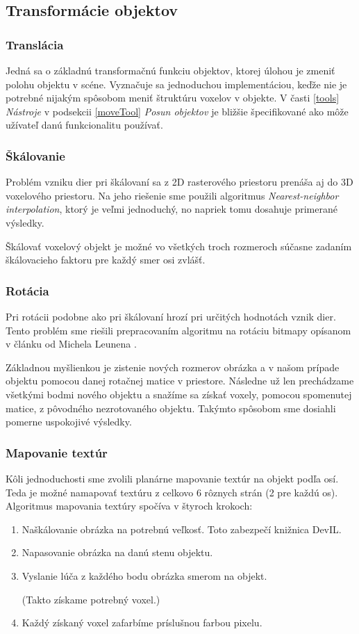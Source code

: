 \subsection{Transformácie objektov}
\subsubsection{Translácia}
Jedná sa o základnú transformačnú funkciu objektov, ktorej úlohou je zmeniť polohu objektu v scéne. Vyznačuje sa jednoduchou implementáciou, keďže nie je potrebné nijakým spôsobom meniť štruktúru voxelov v objekte.
V časti \ref{tools} \textit{Nástroje} v podsekcii \ref{moveTool} \textit{Posun objektov} je bližšie špecifikované ako môže užívateľ danú funkcionalitu používať.

\subsubsection{Škálovanie}
Problém vzniku dier pri škálovaní sa z 2D rasterového priestoru prenáša aj do 3D voxelového priestoru. Na jeho riešenie sme použili algoritmus \textit{Nearest-neighbor interpolation}, ktorý je veľmi jednoduchý, no napriek tomu dosahuje primerané výsledky.

Škálovať voxelový objekt je možné vo všetkých troch rozmeroch súčasne zadaním škálovacieho faktoru pre každý smer osi zvlášť.
\subsubsection{Rotácia}
Pri rotácii podobne ako pri škálovaní hrozí pri určitých hodnotách vznik dier. Tento problém sme riešili prepracovaním algoritmu na rotáciu bitmapy opísanom v článku od Michela Leunena \cite{Rotate}. 

Základnou myšlienkou je zistenie nových rozmerov obrázka a v našom prípade objektu pomocou danej rotačnej matice v priestore. Následne už len prechádzame všetkými bodmi nového objektu a snažíme sa získať voxely, pomocou spomenutej matice, z pôvodného nezrotovaného objektu. Takýmto spôsobom sme dosiahli pomerne uspokojivé výsledky.

\subsubsection{Mapovanie textúr}
Kôli jednoduchosti sme zvolili planárne mapovanie textúr na objekt podľa osí. Teda je možné namapovať textúru z celkovo 6 rôznych strán (2 pre každú os). Algoritmus mapovania textúry spočíva v štyroch krokoch:
\begin{enumerate}
\item Naškálovanie obrázka na potrebnú veľkosť. Toto zabezpečí knižnica DevIL.
\item Napasovanie obrázka na danú stenu objektu.
\item Vyslanie lúča z každého bodu obrázka smerom na objekt. \\ 
\begin{small}(Takto získame potrebný voxel.)\end{small}
\item Každý získaný voxel zafarbíme príslušnou farbou pixelu.
\end{enumerate}

